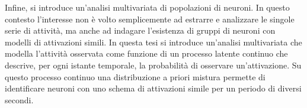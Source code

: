 Infine, si introduce un'analisi multivariata di popolazioni di neuroni. In questo contesto l'interesse non è volto semplicemente ad estrarre e analizzare le singole serie di attività, ma anche ad indagare l'esistenza di gruppi di neuroni con modelli di attivazioni simili.
In questa tesi si introduce un'analisi multivariata che modella l'attività osservata come funzione di un processo latente continuo che descrive, per ogni istante temporale, la probabilità di osservare un'attivazione. Su questo processo continuo una distribuzione a priori mistura permette di identificare neuroni con uno schema di attivazioni simile per un periodo di diversi secondi.
